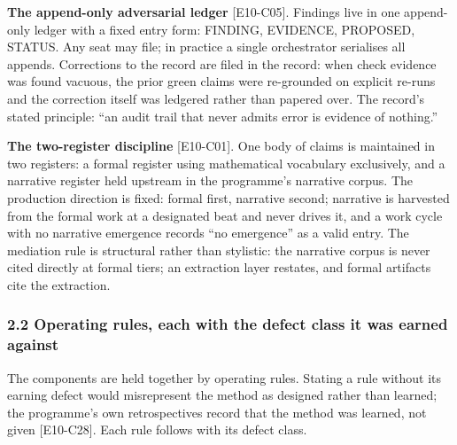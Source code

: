 \documentclass[
  11pt,
]{article}
\begin{document}
\textbf{The append-only adversarial ledger} {[}E10-C05{]}. Findings live
in one append-only ledger with a fixed entry form: FINDING, EVIDENCE,
PROPOSED, STATUS. Any seat may file; in practice a single orchestrator
serialises all appends. Corrections to the record are filed in the
record: when check evidence was found vacuous, the prior green claims
were re-grounded on explicit re-runs and the correction itself was
ledgered rather than papered over. The record's stated principle: ``an
audit trail that never admits error is evidence of nothing.''

\textbf{The two-register discipline} {[}E10-C01{]}. One body of claims
is maintained in two registers: a formal register using mathematical
vocabulary exclusively, and a narrative register held upstream in the
programme's narrative corpus. The production direction is fixed: formal
first, narrative second; narrative is harvested from the formal work at
a designated beat and never drives it, and a work cycle with no
narrative emergence records ``no emergence'' as a valid entry. The
mediation rule is structural rather than stylistic: the narrative corpus
is never cited directly at formal tiers; an extraction layer restates,
and formal artifacts cite the extraction.

\subsubsection{2.2 Operating rules, each with the defect class it was
earned
against}\label{operating-rules-each-with-the-defect-class-it-was-earned-against}

The components are held together by operating rules. Stating a rule
without its earning defect would misrepresent the method as designed
rather than learned; the programme's own retrospectives record that the
method was learned, not given {[}E10-C28{]}. Each rule follows with its
defect class.
\end{document}
